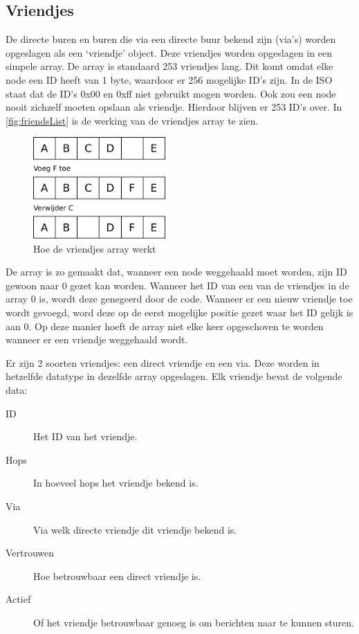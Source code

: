 \subsection{Vriendjes} \label{sec:vriendjes}

De directe buren en buren die via een directe buur bekend zijn (via's) worden opgeslagen als een `vriendje' object. Deze vriendjes worden opgeslagen in een simpele array. De array is standaard 253 vriendjes lang. Dit komt omdat elke node een ID heeft van 1 byte, waardoor er 256 mogelijke ID's zijn. In de ISO staat dat de ID's 0x00 en 0xff niet gebruikt mogen worden. Ook zou een node nooit zichzelf moeten opslaan als vriendje. Hierdoor blijven er 253 ID's over.
In \autoref{fig:friendsList} is de werking van de vriendjes array te zien.


\begin{figure}[ht]
    \centering
    \includegraphics[width=0.45\textwidth]{img/friendList.pdf}
    \caption{Hoe de vriendjes array werkt}
    \label{fig:friendsList}
\end{figure}

De array is zo gemaakt dat, wanneer een node weggehaald moet worden, zijn ID gewoon naar 0 gezet kan worden. Wanneer het ID van een van de vriendjes in de array 0 is, wordt deze genegeerd door de code. Wanneer er een nieuw vriendje toe wordt gevoegd, word deze op de eerst mogelijke positie gezet waar het ID gelijk is aan 0. Op deze manier hoeft de array niet elke keer opgeschoven te worden wanneer er een vriendje weggehaald wordt.

Er zijn 2 soorten vriendjes: een direct vriendje en een via. Deze worden in hetzelfde datatype in dezelfde array opgeslagen. Elk vriendje bevat de volgende data:
\begin{description}
    \item[ID]       Het ID van het vriendje.
    \item[Hops]     In hoeveel hops het vriendje bekend is.
    \item[Via]      Via welk directe vriendje dit vriendje bekend is.
    \item[Vertrouwen]    Hoe betrouwbaar een direct vriendje is.
    \item[Actief]   Of het vriendje betrouwbaar genoeg is om berichten naar te kunnen sturen.
\end{description}

